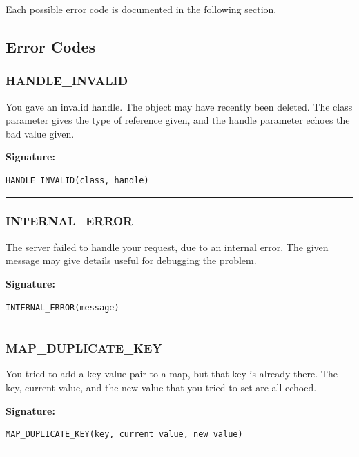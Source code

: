 Each possible error code is documented in the following section.

\subsection{Error Codes}

\subsubsection{HANDLE\_INVALID}

You gave an invalid handle.  The object may have recently been deleted. 
The class parameter gives the type of reference given, and the handle
parameter echoes the bad value given.

\vspace{0.3cm}
{\bf Signature:}
\begin{verbatim}HANDLE_INVALID(class, handle)\end{verbatim}
\begin{center}\rule{10em}{0.1pt}\end{center}

\subsubsection{INTERNAL\_ERROR}

The server failed to handle your request, due to an internal error.  The
given message may give details useful for debugging the problem.

\vspace{0.3cm}
{\bf Signature:}
\begin{verbatim}INTERNAL_ERROR(message)\end{verbatim}
\begin{center}\rule{10em}{0.1pt}\end{center}

\subsubsection{MAP\_DUPLICATE\_KEY}

You tried to add a key-value pair to a map, but that key is already there. 
The key, current value, and the new value that you tried to set are all
echoed.

\vspace{0.3cm}
{\bf Signature:}
\begin{verbatim}MAP_DUPLICATE_KEY(key, current value, new value)\end{verbatim}
\begin{center}\rule{10em}{0.1pt}\end{center}

